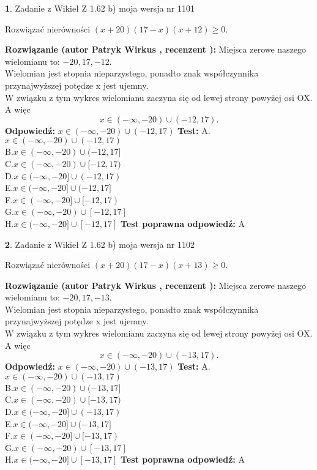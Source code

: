 \documentclass[12pt, a4paper]{article}
\theoremstyle{definition} %
\newtheorem{zad}{}
\newcommand{\zadStart}[1]{\begin{zad}#1\newline}
\newcommand{\zadStop}{\end{zad}}
\newcommand{\rozwStart}[2]{\noindent \textbf{Rozwiązanie (autor #1 , recenzent #2): }\newline}
\newcommand{\rozwStop}{\newline}
\newcommand{\odpStart}{\noindent \textbf{Odpowiedź:}\newline}
\newcommand{\odpStop}{\newline}
\newcommand{\testStart}{\noindent \textbf{Test:}\newline}
\newcommand{\testStop}{\newline}
\newcommand{\kluczStart}{\noindent \textbf{Test poprawna odpowiedź:}\newline}
\newcommand{\kluczStop}{\newline}
\begin{document}
\zadStart{Zadanie z Wikieł Z 1.62 b) moja wersja nr 1101}

Rozwiązać nierówności $(x+20)(17-x)(x+12)\ge0$.
\zadStop
\rozwStart{Patryk Wirkus}{}
Miejsca zerowe naszego wielomianu to: $-20, 17, -12$.\\
Wielomian jest stopnia nieparzystego, ponadto znak współczynnika przy\linebreak najwyższej potędze x jest ujemny.\\ W związku z tym wykres wielomianu zaczyna się od lewej strony powyżej osi OX. A więc $$x \in (-\infty,-20) \cup (-12,17).$$
\rozwStop
\odpStart
$x \in (-\infty,-20) \cup (-12,17)$
\odpStop
\testStart
A.$x \in (-\infty,-20) \cup (-12,17)$\\
B.$x \in (-\infty,-20) \cup (-12,17]$\\
C.$x \in (-\infty,-20) \cup [-12,17)$\\
D.$x \in (-\infty,-20] \cup (-12,17)$\\
E.$x \in (-\infty,-20] \cup (-12,17]$\\
F.$x \in (-\infty,-20] \cup [-12,17)$\\
G.$x \in (-\infty,-20) \cup [-12,17]$\\
H.$x \in (-\infty,-20] \cup [-12,17]$
\testStop
\kluczStart
A
\kluczStop



\zadStart{Zadanie z Wikieł Z 1.62 b) moja wersja nr 1102}

Rozwiązać nierówności $(x+20)(17-x)(x+13)\ge0$.
\zadStop
\rozwStart{Patryk Wirkus}{}
Miejsca zerowe naszego wielomianu to: $-20, 17, -13$.\\
Wielomian jest stopnia nieparzystego, ponadto znak współczynnika przy\linebreak najwyższej potędze x jest ujemny.\\ W związku z tym wykres wielomianu zaczyna się od lewej strony powyżej osi OX. A więc $$x \in (-\infty,-20) \cup (-13,17).$$
\rozwStop
\odpStart
$x \in (-\infty,-20) \cup (-13,17)$
\odpStop
\testStart
A.$x \in (-\infty,-20) \cup (-13,17)$\\
B.$x \in (-\infty,-20) \cup (-13,17]$\\
C.$x \in (-\infty,-20) \cup [-13,17)$\\
D.$x \in (-\infty,-20] \cup (-13,17)$\\
E.$x \in (-\infty,-20] \cup (-13,17]$\\
F.$x \in (-\infty,-20] \cup [-13,17)$\\
G.$x \in (-\infty,-20) \cup [-13,17]$\\
H.$x \in (-\infty,-20] \cup [-13,17]$
\testStop
\kluczStart
A
\kluczStop
\end{document}
